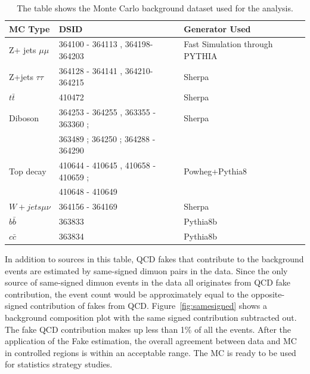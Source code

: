 \begin{table}[!htb]
    \begin{center}
    \caption{
        The table shows the Monte Carlo background dataset used for the analysis. 
    \label{table:MC}
    }
\label{tab:MC samples}
\begin{tabular}{|l|l|l|}
\hline
\textbf{MC Type}   & \textbf{DSID}                                                         &\textbf{Generator Used}\\ \hline
Z+ jets $\mu\mu$   & 364100 - 364113 , 364198-364203                                       &Fast Simulation through PYTHIA\\ \hline
Z+jets $\tau \tau$ & 364128 - 364141 , 364210-364215                                       &Sherpa\\ \hline
$t\bar{t}$         & 410472                                                                &Sherpa\\ \hline
Diboson            & 364253 - 364255 , 363355 - 363360 ; &Sherpa \\
& 363489 ; 364250 ; 364288 - 364290 & \\ \hline
Top decay          & 410644 - 410645 , 410658 - 410659 ;                   &Powheg+Pythia8\\ 
&410648 - 410649 & \\ \hline
$W + jets \mu\nu$  & 364156 - 364169                                                       &Sherpa\\ \hline
$b\bar{b}$         & 363833                                                                &Pythia8b\\ \hline
$c\bar{c}$         & 363834                                                                &Pythia8b\\ \hline
\end{tabular}
\end{center}
\end{table}

In addition to sources in this table, QCD fakes that contribute to the background events are estimated by same-signed dimuon pairs in the data. Since the only source of same-signed dimuon events in the data all originates from QCD fake contribution, the event count would be approximately equal to the opposite-signed contribution of fakes from QCD. Figure~\ref{fig:samesigned} shows a background composition plot with the same signed contribution subtracted out. The fake QCD contribution makes up less
than 1\% of all the events. After the application of the Fake estimation, the overall agreement between data and MC in controlled regions is within an acceptable range. The MC is ready to be used for statistics strategy studies.

